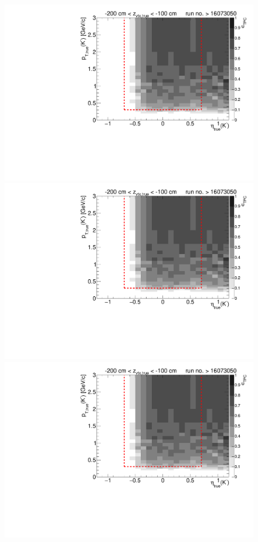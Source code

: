 \begin{figure}[hb]
{		\includegraphics[width=\linewidth,page=6]{graphics/eff/Eff2D_TPC_kaon_Minus_RunRange2.pdf}\\
		\includegraphics[width=\linewidth,page=8]{graphics/eff/Eff2D_TPC_kaon_Minus_RunRange2.pdf}\\
		\includegraphics[width=\linewidth,page=10]{graphics/eff/Eff2D_TPC_kaon_Minus_RunRange2.pdf}
	}%
\end{figure}
